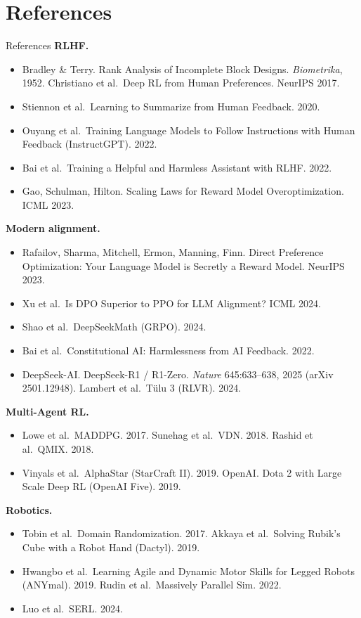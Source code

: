 \section{References}

\begin{frame}[allowframebreaks]{References}
\footnotesize
\textbf{RLHF.}
\begin{itemize}\itemsep0.15em
    \item Bradley \& Terry. Rank Analysis of Incomplete Block Designs.
          \emph{Biometrika}, 1952. \quad Christiano et al.\ Deep RL from Human
          Preferences. NeurIPS 2017.
    \item Stiennon et al.\ Learning to Summarize from Human Feedback. 2020.
    \item Ouyang et al.\ Training Language Models to Follow Instructions with Human
          Feedback (InstructGPT). 2022.
    \item Bai et al.\ Training a Helpful and Harmless Assistant with RLHF. 2022.
    \item Gao, Schulman, Hilton. Scaling Laws for Reward Model Overoptimization.
          ICML 2023.
\end{itemize}
\textbf{Modern alignment.}
\begin{itemize}\itemsep0.15em
    \item Rafailov, Sharma, Mitchell, Ermon, Manning, Finn. Direct Preference
          Optimization: Your Language Model is Secretly a Reward Model. NeurIPS 2023.
    \item Xu et al.\ Is DPO Superior to PPO for LLM Alignment? ICML 2024.
    \item Shao et al.\ DeepSeekMath (GRPO). 2024.
    \item Bai et al.\ Constitutional AI: Harmlessness from AI Feedback. 2022.
    \item DeepSeek-AI. DeepSeek-R1 / R1-Zero. \emph{Nature} 645:633--638, 2025
          (arXiv 2501.12948). \quad Lambert et al.\ T\"ulu 3 (RLVR). 2024.
\end{itemize}
\textbf{Multi-Agent RL.}
\begin{itemize}\itemsep0.15em
    \item Lowe et al.\ MADDPG. 2017. \quad Sunehag et al.\ VDN. 2018. \quad
          Rashid et al.\ QMIX. 2018.
    \item Vinyals et al.\ AlphaStar (StarCraft II). 2019. \quad OpenAI. Dota 2
          with Large Scale Deep RL (OpenAI Five). 2019.
\end{itemize}
\textbf{Robotics.}
\begin{itemize}\itemsep0.15em
    \item Tobin et al.\ Domain Randomization. 2017. \quad Akkaya et al.\ Solving
          Rubik's Cube with a Robot Hand (Dactyl). 2019.
    \item Hwangbo et al.\ Learning Agile and Dynamic Motor Skills for Legged Robots
          (ANYmal). 2019. \quad Rudin et al.\ Massively Parallel Sim. 2022.
    \item Luo et al.\ SERL. 2024.
\end{itemize}


\end{frame}
